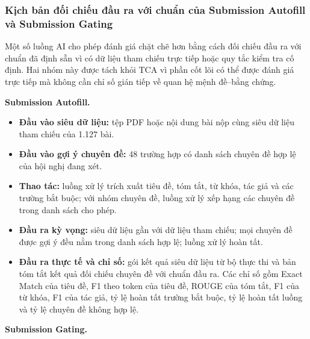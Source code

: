 \subsubsection{Kịch bản đối chiếu đầu ra với chuẩn của Submission Autofill và Submission Gating}

Một số luồng AI cho phép đánh giá chặt chẽ hơn bằng cách đối chiếu đầu ra với chuẩn đã định sẵn vì có dữ liệu tham chiếu trực tiếp hoặc quy tắc kiểm tra cố định. Hai nhóm này được tách khỏi TCA vì phần cốt lõi có thể được đánh giá trực tiếp mà không cần chỉ số gián tiếp về quan hệ mệnh đề--bằng chứng.

\textbf{Submission Autofill.}

\begin{itemize}
  \item \textbf{Đầu vào siêu dữ liệu:} tệp PDF hoặc nội dung bài nộp cùng siêu dữ liệu tham chiếu của 1.127 bài.
  \item \textbf{Đầu vào gợi ý chuyên đề:} 48 trường hợp có danh sách chuyên đề hợp lệ của hội nghị đang xét.
  \item \textbf{Thao tác:} luồng xử lý trích xuất tiêu đề, tóm tắt, từ khóa, tác giả và các trường bắt buộc; với nhóm chuyên đề, luồng xử lý xếp hạng các chuyên đề trong danh sách cho phép.
  \item \textbf{Đầu ra kỳ vọng:} siêu dữ liệu gần với dữ liệu tham chiếu; mọi chuyên đề được gợi ý đều nằm trong danh sách hợp lệ; luồng xử lý hoàn tất.
  \item \textbf{Đầu ra thực tế và chỉ số:} gói kết quả siêu dữ liệu từ bộ thực thi và bản tóm tắt kết quả đối chiếu chuyên đề với chuẩn đầu ra. Các chỉ số gồm Exact Match của tiêu đề, F1 theo token của tiêu đề, ROUGE của tóm tắt, F1 của từ khóa, F1 của tác giả, tỷ lệ hoàn tất trường bắt buộc, tỷ lệ hoàn tất luồng và tỷ lệ chuyên đề không hợp lệ.
\end{itemize}

\textbf{Submission Gating.}

